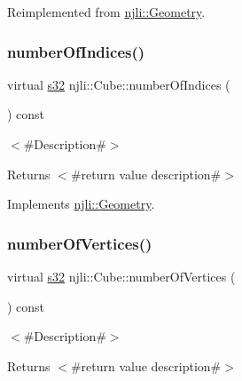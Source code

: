 Reimplemented from \mbox{\hyperlink{classnjli_1_1_geometry_a61477b1983dc37e146232b99eff643e1}{njli\+::\+Geometry}}.

\mbox{\label{classnjli_1_1_cube_a122d3a2b1e326ec33a865cc6f3391229}} 
\subsubsection{\texorpdfstring{number\+Of\+Indices()}{numberOfIndices()}}
{\footnotesize\ttfamily virtual \mbox{\hyperlink{_util_8h_aa62c75d314a0d1f37f79c4b73b2292e2}{s32}} njli\+::\+Cube\+::number\+Of\+Indices (\begin{DoxyParamCaption}{ }\end{DoxyParamCaption}) const\hspace{0.3cm}{\ttfamily [virtual]}}

$<$\#\+Description\#$>$

\begin{DoxyReturn}{Returns}
$<$\#return value description\#$>$ 
\end{DoxyReturn}


Implements \mbox{\hyperlink{classnjli_1_1_geometry_a1033c9f6dee9f725b122c2ddd33f4b0e}{njli\+::\+Geometry}}.

\mbox{\label{classnjli_1_1_cube_aadf462166716a9545b1b2b47078064e7}} 
\subsubsection{\texorpdfstring{number\+Of\+Vertices()}{numberOfVertices()}}
{\footnotesize\ttfamily virtual \mbox{\hyperlink{_util_8h_aa62c75d314a0d1f37f79c4b73b2292e2}{s32}} njli\+::\+Cube\+::number\+Of\+Vertices (\begin{DoxyParamCaption}{ }\end{DoxyParamCaption}) const\hspace{0.3cm}{\ttfamily [virtual]}}

$<$\#\+Description\#$>$

\begin{DoxyReturn}{Returns}
$<$\#return value description\#$>$ 
\end{DoxyReturn}


